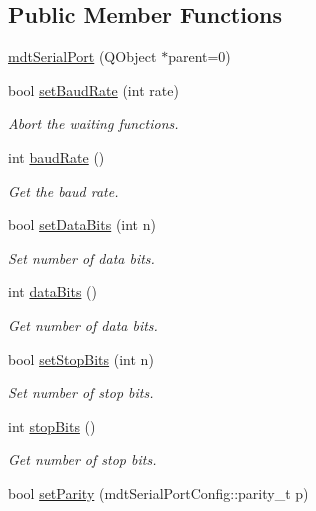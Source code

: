 \subsection*{Public Member Functions}
\begin{DoxyCompactItemize}
\item 
\hyperlink{classmdt_serial_port_a7b2da083885e727981c1fd4414634cae}{mdtSerialPort} (QObject $\ast$parent=0)
\item 
bool \hyperlink{classmdt_serial_port_ad77b6a5fd819fae6db0db888b3113351}{setBaudRate} (int rate)
\begin{DoxyCompactList}\small\item\em Abort the waiting functions. \end{DoxyCompactList}\item 
int \hyperlink{classmdt_serial_port_ab7d9433433f4ec5d5e584721e5bb1195}{baudRate} ()
\begin{DoxyCompactList}\small\item\em Get the baud rate. \end{DoxyCompactList}\item 
bool \hyperlink{classmdt_serial_port_af39774b2d3c4121623253740660a0389}{setDataBits} (int n)
\begin{DoxyCompactList}\small\item\em Set number of data bits. \end{DoxyCompactList}\item 
int \hyperlink{classmdt_serial_port_a65c92bdb5543c1fe0034169ffc88d09f}{dataBits} ()
\begin{DoxyCompactList}\small\item\em Get number of data bits. \end{DoxyCompactList}\item 
bool \hyperlink{classmdt_serial_port_a9471ebff90de41decee977566dd1571f}{setStopBits} (int n)
\begin{DoxyCompactList}\small\item\em Set number of stop bits. \end{DoxyCompactList}\item 
int \hyperlink{classmdt_serial_port_a163a83bdcac2c81a5c6b097c4afde41f}{stopBits} ()
\begin{DoxyCompactList}\small\item\em Get number of stop bits. \end{DoxyCompactList}\item 
bool \hyperlink{classmdt_serial_port_ae435f052a87dcd0b1829f1577bb5e58d}{setParity} (mdtSerialPortConfig::parity\_\-t p)

\end{DoxyCompactItemize}
